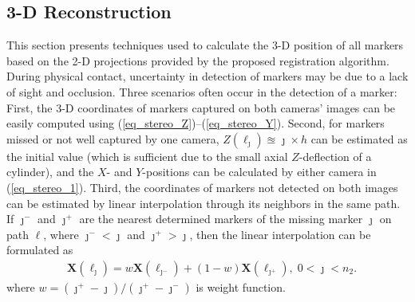 \documentclass[10pt,letterpaper,journal,final,twoside,twocolumn,nofonttune]{IEEEtran}
\begin{document}
\subsection{3-D Reconstruction}
This section presents techniques used to calculate the 3-D position of all markers based on the 2-D projections provided by the proposed registration algorithm. During physical contact, uncertainty in detection of markers may be due to a lack of sight and occlusion. Three scenarios often occur in the detection of a marker: First, the 3-D coordinates of markers captured on both cameras' images can be easily computed using (\ref{eq_stereo_Z})--(\ref{eq_stereo_Y}). Second, for markers missed or not well captured by one camera, $Z(\ell_\jmath)\approxeq \jmath\times h$ can be estimated as the initial value (which is sufficient due to the small axial $Z$-deflection of a cylinder), and the $X$- and $Y$-positions can be calculated by either camera in (\ref{eq_stereo_1}). Third, the coordinates of markers not detected on both images can be estimated by linear interpolation through its neighbors in the same path. If $\jmath^{\scriptscriptstyle -}$ and $\jmath^{\scriptscriptstyle +}$ are the nearest determined markers of the missing marker $\jmath$ on path $\ell$, where $\jmath^{\scriptscriptstyle -} < \jmath$ and $ \jmath^{\scriptscriptstyle +} > \jmath$, then the linear interpolation can be formulated as 
\begin{align}
&\mathbf{X}(\ell_\jmath)\! =w\mathbf{X}({\ell_{\jmath^{\scriptscriptstyle -}}}) + (1-w)\mathbf{X}({\ell_{\jmath^+}}),\;0<\jmath<n_2.
\end{align}
where $w = (\jmath^{{\scriptscriptstyle +}} -\jmath)/(\jmath^{\scriptscriptstyle +}-\jmath^{\scriptscriptstyle -})$ is weight function.
\end{document}
